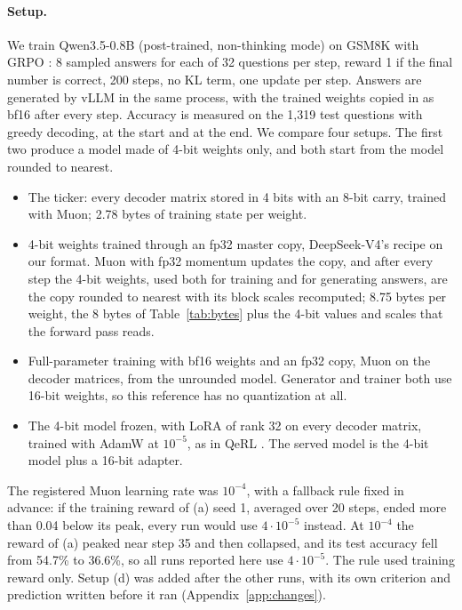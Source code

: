 \documentclass[11pt]{article}
\begin{document}
\paragraph{Setup.} We train Qwen3.5-0.8B (post-trained, non-thinking mode) on GSM8K \citep{cobbe2021gsm8k} with GRPO
\citep{shao2024deepseekmath}: 8 sampled answers for each of 32 questions per step, reward 1 if the final number is
correct, 200 steps, no KL term, one update per step. Answers are generated by vLLM \citep{kwon2023vllm} in the same
process, with the trained weights copied in as bf16 after every step. Accuracy is measured on the 1,319 test questions
with greedy decoding, at the start and at the end. We compare four setups. The first two produce a model made of 4-bit
weights only, and both start from the model rounded to nearest.
\begin{itemize}
  \item[(c)] The ticker: every decoder matrix stored in 4 bits with an 8-bit carry, trained with Muon; 2.78 bytes of
        training state per weight.
  \item[(d)] 4-bit weights trained through an fp32 master copy, DeepSeek-V4's recipe on our format. Muon with fp32
        momentum updates the copy, and after every step the 4-bit weights, used both for training and for generating
        answers, are the copy rounded to nearest with its block scales recomputed; 8.75 bytes per weight, the 8 bytes
        of Table~\ref{tab:bytes} plus the 4-bit values and scales that the forward pass reads.
  \item[(a)] Full-parameter training with bf16 weights and an fp32 copy, Muon on the decoder matrices, from the
        unrounded model. Generator and trainer both use 16-bit weights, so this reference has no quantization at all.
  \item[(b)] The 4-bit model frozen, with LoRA \citep{hu2022lora} of rank 32 on every decoder matrix, trained with
        AdamW at $10^{-5}$, as in QeRL \citep{huang2025qerl}. The served model is the 4-bit model plus a 16-bit adapter.
\end{itemize}
The registered Muon learning rate was $10^{-4}$, with a fallback rule fixed in advance: if the training reward of (a)
seed 1, averaged over 20 steps, ended more than 0.04 below its peak, every run would use $4\cdot10^{-5}$ instead. At
$10^{-4}$ the reward of (a) peaked near step 35 and then collapsed, and its test accuracy fell from 54.7\% to 36.6\%, so
all runs reported here use $4\cdot10^{-5}$. The rule used training reward only. Setup (d) was added after the other
runs, with its own criterion and prediction written before it ran (Appendix~\ref{app:changes}).
\end{document}
